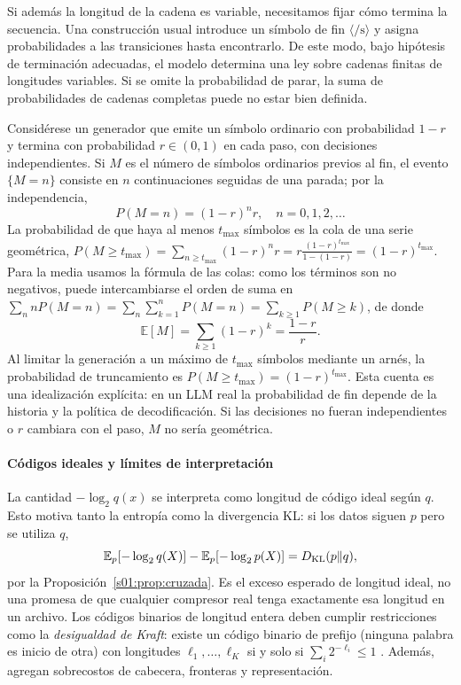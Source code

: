 Si además la longitud de la cadena es variable, necesitamos fijar
cómo termina la secuencia. Una construcción usual introduce un símbolo
de fin $\langle/\mathrm{s}\rangle$ y asigna probabilidades a las
transiciones hasta encontrarlo. De este modo, bajo hipótesis de
terminación adecuadas, el modelo determina una ley sobre cadenas
finitas de longitudes variables. Si se omite la probabilidad de parar,
la suma de probabilidades de cadenas completas puede no estar
bien definida.

\begin{ejemplo}
Considérese un generador que emite un símbolo ordinario con probabilidad
$1-r$ y termina con probabilidad $r\in(0,1)$ en cada paso, con decisiones
independientes. Si $M$ es el número de símbolos ordinarios previos al fin,
el evento $\{M=n\}$ consiste en $n$ continuaciones seguidas de una parada; por la
independencia,
\[
P(M=n)=(1-r)^nr,\quad n=0,1,2,\ldots
\]
La probabilidad de que haya al menos $t_{\max}$ símbolos es la cola de una serie
geométrica,
$P(M\ge t_{\max})=\sum_{n\ge t_{\max}}(1-r)^nr=r\frac{(1-r)^{t_{\max}}}{1-(1-r)}=(1-r)^{t_{\max}}$.
Para la media usamos la fórmula de las colas: como los términos son no negativos,
puede intercambiarse el orden de suma en
$\sum_nnP(M=n)=\sum_n\sum_{k=1}^nP(M=n)=\sum_{k\ge1}P(M\ge k)$, de donde
\[
\mathbb E[M]=\sum_{k\ge1}(1-r)^k=\frac{1-r}{r}.
\]
Al limitar la generación a un máximo de $t_{\max}$ símbolos mediante un arnés,
la probabilidad de truncamiento es $P(M\ge t_{\max})=(1-r)^{t_{\max}}$.
Esta cuenta es una idealización explícita: en un LLM real la probabilidad
de fin depende de la historia y la política de decodificación. Si las decisiones
no fueran independientes o $r$ cambiara con el paso, $M$ no sería geométrica.
\end{ejemplo}

\paragraph{Códigos ideales y límites de interpretación}

La cantidad $-\log_2q(x)$ se interpreta como longitud de código ideal
según $q$. Esto motiva tanto la entropía como la divergencia KL:
si los datos siguen $p$ pero se utiliza $q$,
\[
\mathbb E_p[-\log_2q(X)]-\mathbb E_p[-\log_2p(X)]
=D_{\rm KL}(p\|q),
\]
por la Proposición~\ref{s01:prop:cruzada}.
Es el exceso esperado de longitud ideal, no una promesa de que
cualquier compresor real tenga exactamente esa longitud en un archivo.
Los códigos binarios de longitud entera deben cumplir restricciones
como la \emph{desigualdad de Kraft}: existe un código binario de prefijo (ninguna
palabra es inicio de otra) con longitudes $\ell_1,\ldots,\ell_K$ si y solo si
$\sum_i2^{-\ell_i}\le1$ \citep[cap.~5]{cover2006}. Además, agregan sobrecostos de
cabecera, fronteras y representación.

